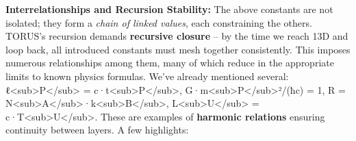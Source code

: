 \documentclass[
]{article}
\begin{document}
\textbf{Interrelationships and Recursion Stability:} The above constants
are not isolated; they form a \emph{chain of linked values}, each
constraining the others. TORUS's recursion demands \textbf{recursive
closure} -- by the time we reach 13D and loop back, all introduced
constants must mesh together consistently. This imposes numerous
relationships among them, many of which reduce in the appropriate limits
to known physics formulas. We've already mentioned several:
ℓ\textless sub\textgreater P\textless/sub\textgreater{} =
c·t\textless sub\textgreater P\textless/sub\textgreater,
G·m\textless sub\textgreater P\textless/sub\textgreater²/(ħc) = 1, R =
N\textless sub\textgreater A\textless/sub\textgreater·k\textless sub\textgreater B\textless/sub\textgreater,
L\textless sub\textgreater U\textless/sub\textgreater{} =
c·T\textless sub\textgreater U\textless/sub\textgreater. These are
examples of \textbf{harmonic relations} ensuring continuity between
layers. A few highlights:
\end{document}

